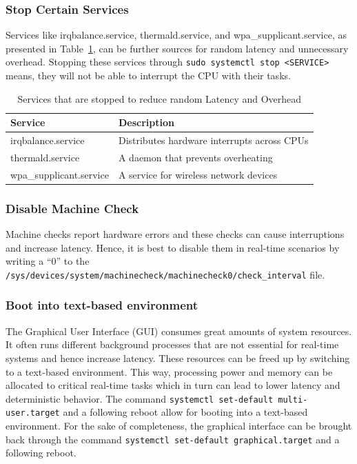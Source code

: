 \documentclass[MMR,Master,english]{twbook}
\begin{document}
\clearpage

\subsubsection{Stop Certain Services}
Services like irqbalance.service, thermald.service, and wpa\_supplicant.service, as presented in Table~\ref{tab:stop_servies}, can be further sources for random latency and unnecessary overhead. Stopping these services through \texttt{sudo systemctl stop <SERVICE>} means, they will not be able to interrupt the CPU with their tasks.

\begin{table}[H]
	\centering
	\caption{Services that are stopped to reduce random Latency and Overhead}
	\label{tab:stop_servies}
	\setlength{\tabcolsep}{0.5em} %
	{\renewcommand{\arraystretch}{1.2}%
		\begin{tabular}{|l|l|}
			\hline
			\textbf{Service}        & \textbf{Description}                        \\
			\hline
			irqbalance.service      & Distributes hardware interrupts across CPUs \\\hline
			thermald.service        & A daemon that prevents overheating          \\\hline
			wpa\_supplicant.service & A service for wireless network devices      \\
			\hline
		\end{tabular}}
\end{table}
\subsubsection{Disable Machine Check}
Machine checks report hardware errors and these checks can cause interruptions and increase latency. Hence, it is best to disable them in real-time scenarios by writing a ``0'' to the \texttt{/sys/devices/system/machinecheck/machinecheck0/check\_interval} file.

\subsubsection{Boot into text-based environment}
The Graphical User Interface (GUI) consumes great amounts of system resources. It often runs different background processes that are not essential for real-time systems and hence increase latency. These resources can be freed up by switching to a text-based environment. This way, processing power and memory can be allocated to critical real-time tasks which in turn can lead to lower latency and deterministic behavior. The command \texttt{systemctl set-default multi-user.target} and a following reboot allow for booting into a text-based environment. For the sake of completeness, the graphical interface can be brought back through the command \texttt{systemctl set-default graphical.target} and a following reboot.
\end{document}
